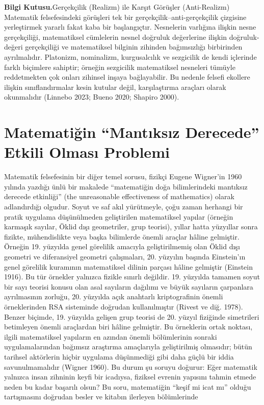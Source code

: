 \begin{tcolorbox}[bookbox,colback=cEx]\textbf{\textsf{\textcolor{cAcc}{Bilgi Kutusu.}}}\quad Gerçekçilik (Realizm) ile Karşıt Görüşler (Anti-Realizm) Matematik felsefesindeki görüşleri tek bir gerçekçilik–anti-gerçekçilik çizgisine yerleştirmek yararlı fakat kaba bir başlangıçtır. Nesnelerin varlığına ilişkin nesne gerçekçiliği, matematiksel cümlelerin nesnel doğruluk değerlerine ilişkin doğruluk-değeri gerçekçiliği ve matematiksel bilginin zihinden bağımsızlığı birbirinden ayrılmalıdır. Platonizm, nominalizm, kurgusalcılık ve sezgicilik de kendi içlerinde farklı biçimlere sahiptir; örneğin sezgicilik matematiksel nesneleri tümüyle reddetmekten çok onları zihinsel inşaya bağlayabilir. Bu nedenle felsefi ekollere ilişkin sınıflandırmalar kesin kutular değil, karşılaştırma araçları olarak okunmalıdır (Linnebo 2023; Bueno 2020; Shapiro 2000).\end{tcolorbox}

\section{Matematiğin “Mantıksız Derecede” Etkili Olması Problemi}

Matematik felsefesinin bir diğer temel sorusu, fizikçi Eugene Wigner’in 1960 yılında yazdığı ünlü bir makalede “matematiğin doğa bilimlerindeki mantıksız derecede etkinliği” (the unreasonable effectiveness of mathematics) olarak adlandırdığı olgudur. Soyut ve saf akıl yürütmeyle, çoğu zaman herhangi bir pratik uygulama düşünülmeden geliştirilen matematiksel yapılar (örneğin karmaşık sayılar, Öklid dışı geometriler, grup teorisi), yıllar hatta yüzyıllar sonra fizikte, mühendislikte veya başka bilimlerde önemli araçlar hâline gelmiştir. Örneğin 19. yüzyılda genel görelilik amacıyla geliştirilmemiş olan Öklid dışı geometri ve diferansiyel geometri çalışmaları, 20. yüzyılın başında Einstein’ın genel görelilik kuramının matematiksel dilinin parçası hâline gelmiştir (Einstein 1916). Bu tür örnekler yalnızca fizikle sınırlı değildir. 19. yüzyılda tamamen soyut bir sayı teorisi konusu olan asal sayıların dağılımı ve büyük sayıların çarpanlara ayrılmasının zorluğu, 20. yüzyılda açık anahtarlı kriptografinin önemli örneklerinden RSA sisteminde doğrudan kullanılmıştır (Rivest ve diğ. 1978). Benzer biçimde, 19. yüzyılda gelişen grup teorisi de 20. yüzyıl fiziğinde simetrileri betimleyen önemli araçlardan biri hâline gelmiştir. Bu örneklerin ortak noktası, ilgili matematiksel yapıların en azından önemli bölümlerinin sonraki uygulamalarından bağımsız araştırma amaçlarıyla geliştirilmiş olmasıdır; bütün tarihsel aktörlerin hiçbir uygulama düşünmediği gibi daha güçlü bir iddia savunulmamalıdır (Wigner 1960). Bu durum şu soruyu doğurur: Eğer matematik yalnızca insan zihninin keyfi bir icadıysa, fiziksel evrenin yapısını tahmin etmede neden bu kadar başarılı olsun? Bu soru, matematiğin “keşif mi icat mı” olduğu tartışmasını doğrudan besler ve kitabın ilerleyen bölümlerinde

